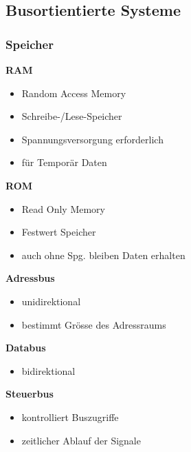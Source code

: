 \subsection{Busortientierte Systeme}
\subsubsection{Speicher}
\begin{multicols}{2}
    \textbf{RAM}
    \begin{itemize}
        \item Random Access Memory
        \item Schreibe-/Lese-Speicher
        \item Spannungsversorgung erforderlich
        \item für Temporär Daten
    \end{itemize}

    \textbf{ROM}
    \begin{itemize}
        \item Read Only Memory
        \item Festwert Speicher
        \item auch ohne Spg. bleiben Daten erhalten
    \end{itemize}
\end{multicols}

\begin{multicols}{3}
    \begin{minipage}{4cm}
        \textbf{Adressbus}
        \begin{itemize}
            \item unidirektional
            \item bestimmt Grösse des Adressraums
        \end{itemize}
    \end{minipage}
    
    \begin{minipage}{4cm}
        \textbf{Databus}
        \begin{itemize}
            \item bidirektional
        \end{itemize}
    \end{minipage}
    
    \begin{minipage}{5cm}
        \textbf{Steuerbus}
        \begin{itemize}
            \item kontrolliert Buszugriffe
            \item zeitlicher Ablauf der Signale
        \end{itemize}
    \end{minipage}
\end{multicols}

